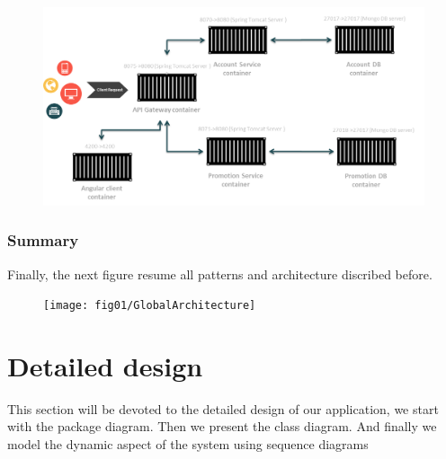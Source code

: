 \begin{figure}[h!]
	\centering
	\includegraphics[height=0.3\textheight]{fig01/MicroservicesDeployment}
	\label{fig:FilialesEtClients}
\end{figure}
\newpage

\subsubsection{ Summary }

Finally, the next figure resume all patterns and architecture discribed before.

\begin{figure}[h!]
	\centering
	\texttt{[image: fig01/GlobalArchitecture]}
	\label{fig:FilialesEtClients}
\end{figure}

\section{ Detailed design }
This section will be devoted to the detailed design of our application, 
we start with the package diagram. 
Then we present the class diagram.
And finally we model the dynamic aspect of the system using sequence diagrams
